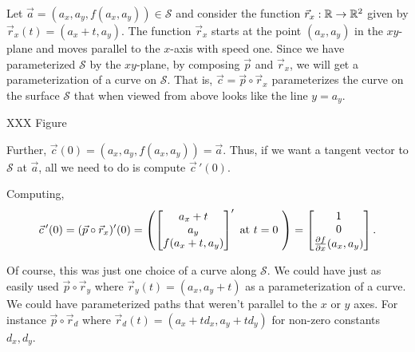 Let $\vec a=(a_x,a_y,f(a_x,a_y))\in\mathcal S$ and consider the function $\vec r_x:\mathbb{R}\to\mathbb{R}^2$
given by $\vec r_x(t) = (a_x+t,a_y)$.  The function $\vec r_x$ starts at the point $(a_x,a_y)$
in the $xy$-plane and moves parallel to the $x$-axis with speed one.  Since we have parameterized
$\mathcal S$ by the $xy$-plane, by composing $\vec p$ and $\vec r_x$, we will get a parameterization
of a curve on $\mathcal S$.  That is, $\vec c=\vec p\circ \vec r_x$ parameterizes the curve
on the surface $\mathcal S$ that when viewed from above looks like the line $y=a_y$.

XXX Figure

Further, $\vec c(0)=(a_x,a_y,f(a_x,a_y))=\vec a$.  Thus, if we want a tangent
vector to $\mathcal S$ at $\vec a$, all we need to do is compute $\vec c\,'(0)$.

Computing,
\[
	\vec c\,'(0)=(\vec p\circ \vec r_x)'(0)=
	\left(\begin{bmatrix}a_x+t\\a_y\\f(a_x+t,a_y)\end{bmatrix}'\text{ at $t=0$ } \right)
	= \begin{bmatrix}1\\0\\\frac{\partial f}{\partial x}(a_x,a_y)\end{bmatrix}.
\]

Of course, this was just one choice of a curve along $\mathcal S$.  We could
have just as easily used $\vec p\circ \vec r_y$ where $\vec r_y(t)=(a_x,a_y+t)$
as a parameterization of a curve.  We could have parameterized paths
that weren't parallel to the $x$ or $y$ axes.  For instance
$\vec p\circ \vec r_{d}$ where $\vec r_{d}(t) = (a_x+td_x, a_y+td_y)$
for non-zero constants $d_x,d_y$.

